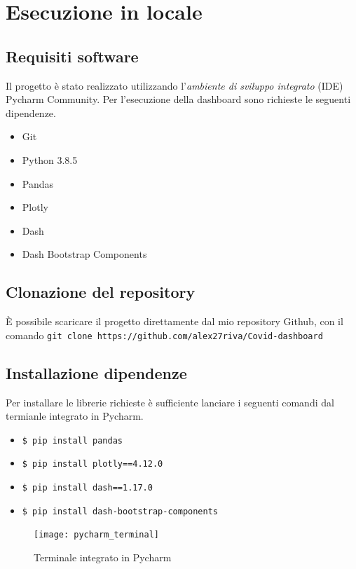
\section{Esecuzione in locale}

\subsection{Requisiti software}
Il progetto è stato realizzato utilizzando l'\emph{ambiente di sviluppo integrato} (IDE) Pycharm Community.
Per l'esecuzione della dashboard sono richieste le seguenti dipendenze.
\enlargethispage{\baselineskip}
\begin{itemize}
 \item Git
 \item Python 3.8.5
 \item Pandas
 \item Plotly 
 \item Dash 
 \item Dash Bootstrap Components
 \end{itemize}

 \subsection{Clonazione del repository}
 È possibile scaricare il progetto direttamente dal mio repository Github, con il comando \texttt{git clone https://github.com/alex27riva/Covid-dashboard}
 
 \subsection{Installazione dipendenze}
 Per installare le librerie richieste è sufficiente lanciare i seguenti comandi dal termianle integrato in Pycharm.
 
 \begin{itemize}
     \item \texttt{\$ pip install pandas}
     \item \texttt{\$ pip install plotly==4.12.0}
     \item \texttt{\$ pip install dash==1.17.0}
     \item \texttt{\$ pip install dash-bootstrap-components}
 \end{itemize}
 
 \begin{figure}[htp]
    \centering
    \texttt{[image: pycharm\_terminal]}
    \caption{Terminale integrato in Pycharm}
    \label{fig:pycharm_termianl}
\end{figure}

